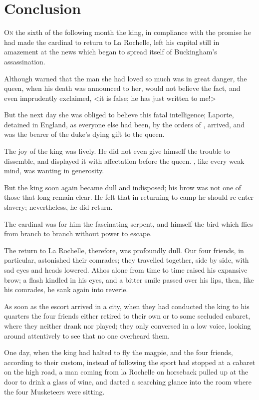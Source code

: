 
\chapter{Conclusion}

\lettrine{O}{n} the sixth of the following month the king, in compliance with the promise he had made the cardinal to return to La Rochelle, left his capital still in amazement at the news which began to spread itself of Buckingham's assassination. 

Although warned that the man she had loved so much was in great danger, the queen, when his death was announced to her, would not believe the fact, and even imprudently exclaimed, <it is false; he has just written to me!> 

But the next day she was obliged to believe this fatal intelligence; Laporte, detained in England, as everyone else had been, by the orders of , arrived, and was the bearer of the duke's dying gift to the queen. 

The joy of the king was lively. He did not even give himself the trouble to dissemble, and displayed it with affectation before the queen. , like every weak mind, was wanting in generosity. 

But the king soon again became dull and indisposed; his brow was not one of those that long remain clear. He felt that in returning to camp he should re-enter slavery; nevertheless, he did return. 

The cardinal was for him the fascinating serpent, and himself the bird which flies from branch to branch without power to escape. 

The return to La Rochelle, therefore, was profoundly dull. Our four friends, in particular, astonished their comrades; they travelled together, side by side, with sad eyes and heads lowered. Athos alone from time to time raised his expansive brow; a flash kindled in his eyes, and a bitter smile passed over his lips, then, like his comrades, he sank again into reverie. 

As soon as the escort arrived in a city, when they had conducted the king to his quarters the four friends either retired to their own or to some secluded cabaret, where they neither drank nor played; they only conversed in a low voice, looking around attentively to see that no one overheard them. 

One day, when the king had halted to fly the magpie, and the four friends, according to their custom, instead of following the sport had stopped at a cabaret on the high road, a man coming from la Rochelle on horseback pulled up at the door to drink a glass of wine, and darted a searching glance into the room where the four Musketeers were sitting. 


